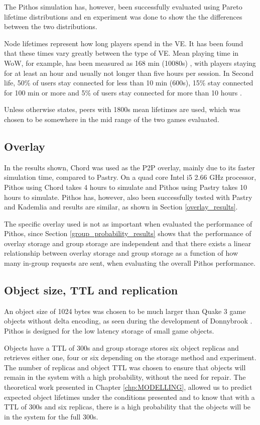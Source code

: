 The Pithos simulation has, however, been successfully evaluated using Pareto lifetime distributions and en experiment was done to show the the differences between the two distributions.

Node lifetimes represent how long players spend in the VE. It has been found that these times vary greatly between the type of VE. Mean playing time in WoW, for example, has been measured as 168 min (10080s) \cite{wow_gameplay_hours}, with players staying for at least an hour and usually not longer than five hours per session. In Second life, 50\% of users stay connected for less than 10 min (600s), 15\% stay connected for 100 min or more and 5\% of users stay connected for more than 10 hours \cite{Varvello_life_in_second_life}.

Unless otherwise states, peers with 1800s mean lifetimes are used, which was chosen to be somewhere in the mid range of the two games evaluated.

\subsection{Overlay}
In the results shown, Chord was used as the P2P overlay, mainly due to its faster simulation time, compared to Pastry. On a quad core Intel i5 2.66 GHz processor, Pithos using Chord takes 4 hours to simulate and Pithos using Pastry takes 10 hours to simulate. Pithos has, however, also been successfully tested with Pastry and Kademlia and results are similar, as shown in Section \ref{overlay_results}.

The specific overlay used is not as important when evaluated the performance of Pithos, since Section \ref{group_probability_results} shows that the performance of overlay storage and group storage are independent and that there exists a linear relationship between overlay storage and group storage as a function of how many in-group requests are sent, when evaluating the overall Pithos performance.

\subsection{Object size, TTL and replication}
An object size of 1024 bytes was chosen to be much larger than Quake 3 game objects without delta encoding, as seen during the development of Donnybrook \cite{Bharambe_Donnybrook}. Pithos is designed for the low latency storage of small game objects.

Objects have a TTL of 300s and group storage stores six object replicas and retrieves either one, four or six depending on the storage method and experiment. The number of replicas and object TTL was chosen to ensure that objects will remain in the system with a high probability, without the need for repair. The theoretical work presented in Chapter \ref{chp:MODELLING}, allowed us to predict expected object lifetimes under the conditions presented and to know that with a TTL of 300s and six replicas, there is a high probability that the objects will be in the system for the full 300s.

